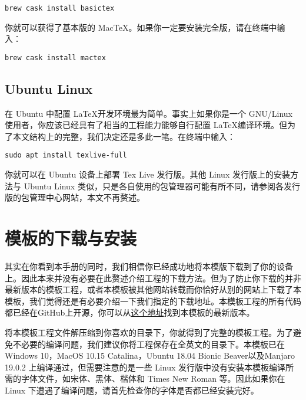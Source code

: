 \begin{tcolorbox}
\begin{lstlisting}
brew cask install basictex
\end{lstlisting}
\end{tcolorbox}

\noindent 你就可以获得了基本版的 MacTeX。如果你一定要安装完全版，请在终端中输入：

\begin{tcolorbox}
\begin{lstlisting}
brew cask install mactex
\end{lstlisting}
\end{tcolorbox}

\subsection{Ubuntu Linux}

在 Ubuntu 中配置 \LaTeX 开发环境最为简单。事实上如果你是一个 GNU/Linux 使用者，你应该已经具有了相当的工程能力能够自行配置 \LaTeX 编译环境。但为了本文结构上的完整，我们决定还是多此一笔。在终端中输入：

\begin{tcolorbox}
\begin{lstlisting}
sudo apt install texlive-full
\end{lstlisting}
\end{tcolorbox}

\noindent 你就可以在 Ubuntu 设备上部署 Tex Live 发行版。其他 Linux 发行版上的安装方法与 Ubuntu Linux 类似，只是各自使用的包管理器可能有所不同，请参阅各发行版的包管理中心网站，本文不再赘述。

\section{模板的下载与安装}
\label{sec:template_download}

其实在你看到本手册的同时，我们相信你已经成功地将本模版下载到了你的设备上。因此本来并没有必要在此赘述介绍工程的下载方法。但为了防止你下载的并非最新版本的模板工程，或者本模板被其他网站转载而你恰好从别的网站上下载了本模板，我们觉得还是有必要介绍一下我们指定的下载地址。本模板工程的所有代码都已经在GitHub上开源，你可以从\href{https://github.com/herculas/SEU-master-thesis}{这个地址}找到本模板的最新版本。

将本模板工程文件解压缩到你喜欢的目录下，你就得到了完整的模板工程。为了避免不必要的编译问题，我们建议你将工程保存在全英文的目录下。本模板已在 Windows 10，MacOS 10.15 Catalina，Ubuntu 18.04 Bionic Beaver以及Manjaro 19.0.2 上编译通过，但需要注意的是一些 Linux 发行版中没有安装本模板编译所需的字体文件，如宋体、黑体、楷体和 Times New Roman 等。因此如果你在 Linux 下遭遇了编译问题，请首先检查你的字体是否都已经安装完好。

